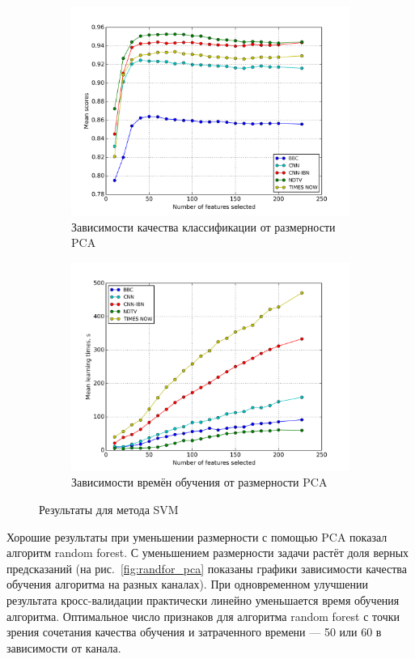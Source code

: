 \begin{figure}[h!]
    \centering
	\begin{subfigure}{0.45\textwidth}
		\includegraphics[width=\textwidth]{images/PCA-SVM.png}
		\caption{Зависимости качества классификации от размерности PCA}
	\end{subfigure}
	\begin{subfigure}{0.45\textwidth}
		\includegraphics[width=\textwidth]{images/PCA-SVMTime.png}
		\caption{Зависимости времён обучения от размерности PCA}
	\end{subfigure}
	\caption{Результаты для метода SVM}\label{fig:svm_pca}
\end{figure}

\par
 Хорошие результаты при уменьшении размерности с помощью PCA показал алгоритм random forest. С уменьшением размерности задачи растёт доля верных предсказаний (на рис.~\ref{fig:randfor_pca} показаны графики 
 зависимости качества обучения алгоритма на разных каналах).
 При одновременном улучшении результата кросс-валидации практически линейно уменьшается время обучения алгоритма. Оптимальное число признаков для алгоритма random forest с точки зрения сочетания качества обучения и затраченного времени --- 50 или 60 в зависимости от канала.
 

